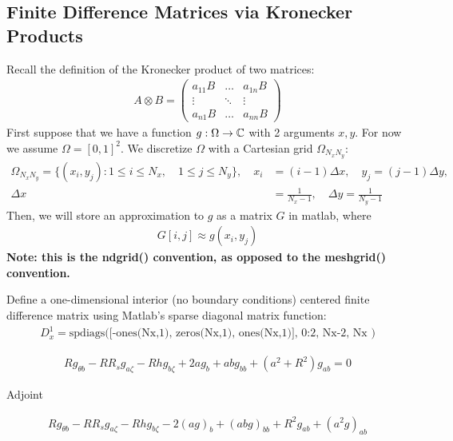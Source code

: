 \documentclass[12pt]{article}
\begin{document}
\subsection{Finite Difference Matrices via Kronecker Products}
Recall the definition of the Kronecker product of two matrices: 
\begin{align*}
A\otimes B = \left(\begin{array}{c|c|c}
a_{11}B &\ldots & a_{1n}B\\\hline
\vdots & \ddots & \vdots \\\hline 
a_{n1}B & \ldots & a_{nn}B
\end{array}\right) 
\end{align*}
First suppose that we have a function $g:\Omega\rightarrow \mathbb{C}$ with 2 arguments $x,y$. For now we assume $\Omega = [0,1]^2$. We discretize $\Omega$ with a Cartesian grid $\Omega_{N_xN_y}: $
\begin{align*}
\Omega_{N_xN_y} = \{(x_i,y_j) : 1\leq i\leq N_x,\quad 1\leq j\leq N_y\},\quad x_i &= (i-1)\Delta x,\quad y_j = (j-1)\Delta y,\\ 
\Delta x &=\frac{1}{N_x-1},\quad \Delta y = \frac{1}{N_y-1}
\end{align*} Then, we will store an approximation to $g$ as a matrix $G$ in matlab, where 
\begin{align*}
G[i,j] \approx g(x_i,y_j)
\end{align*} \textbf{Note: this is the ndgrid() convention, as opposed to the meshgrid() convention.}



Define a one-dimensional interior (no boundary conditions) centered finite difference matrix using Matlab's sparse diagonal matrix function:
\begin{align*}
D^1_x = \text{spdiags([-ones(Nx,1), zeros(Nx,1), ones(Nx,1)], 0:2, Nx-2, Nx  )}
\end{align*}


\begin{align*}
Rg_{\theta b} - RR_s g_{a\zeta} - Rhg_{b\zeta} + 2ag_b + abg_{bb} + (a^2+R^2)g_{ab} = 0
\end{align*}

Adjoint 

\begin{align*}
Rg_{\theta b} - RR_s g_{a\zeta} - Rhg_{b\zeta} - 2(ag)_b + (abg)_{bb} + R^2 g_{ab} + (a^2 g)_{ab} 
\end{align*}
\end{document}
